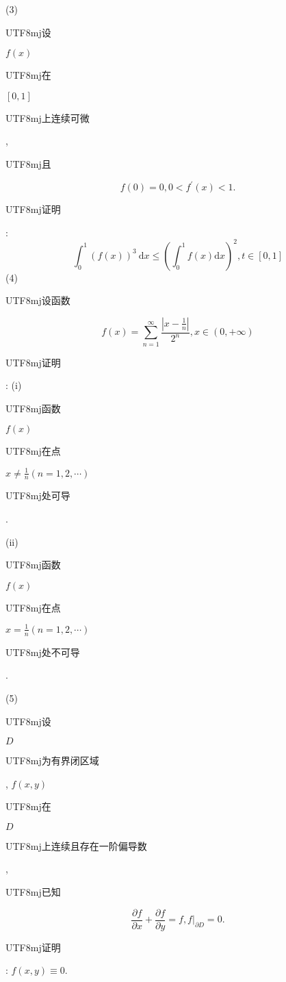 \documentclass[10pt]{article}
\begin{document}
(3) \begin{CJK}{UTF8}{mj}设\end{CJK} $f(x)$ \begin{CJK}{UTF8}{mj}在\end{CJK} $[0,1]$ \begin{CJK}{UTF8}{mj}上连续可微\end{CJK}, \begin{CJK}{UTF8}{mj}且\end{CJK}
$$
f(0)=0,0<f^{\prime}(x)<1 .
$$
\begin{CJK}{UTF8}{mj}证明\end{CJK}:
$$
\int_{0}^{1}(f(x))^{3} \mathrm{~d} x \leq\left(\int_{0}^{1} f(x) \mathrm{d} x\right)^{2}, t \in[0,1]
$$
(4) \begin{CJK}{UTF8}{mj}设函数\end{CJK}
$$
f(x)=\sum_{n=1}^{\infty} \frac{\left|x-\frac{1}{n}\right|}{2^{n}}, x \in(0,+\infty)
$$
\begin{CJK}{UTF8}{mj}证明\end{CJK}: (i) \begin{CJK}{UTF8}{mj}函数\end{CJK} $f(x)$ \begin{CJK}{UTF8}{mj}在点\end{CJK} $x \neq \frac{1}{n}(n=1,2, \cdots)$ \begin{CJK}{UTF8}{mj}处可导\end{CJK}.

(ii) \begin{CJK}{UTF8}{mj}函数\end{CJK} $f(x)$ \begin{CJK}{UTF8}{mj}在点\end{CJK} $x=\frac{1}{n}(n=1,2, \cdots)$ \begin{CJK}{UTF8}{mj}处不可导\end{CJK}.

(5) \begin{CJK}{UTF8}{mj}设\end{CJK} $D$ \begin{CJK}{UTF8}{mj}为有界闭区域\end{CJK}, $f(x, y)$ \begin{CJK}{UTF8}{mj}在\end{CJK} $D$ \begin{CJK}{UTF8}{mj}上连续且存在一阶偏导数\end{CJK}, \begin{CJK}{UTF8}{mj}已知\end{CJK}
$$
\frac{\partial f}{\partial x}+\frac{\partial f}{\partial y}=f,\left.f\right|_{\partial D}=0 .
$$
\begin{CJK}{UTF8}{mj}证明\end{CJK}: $f(x, y) \equiv 0$.
\end{document}
